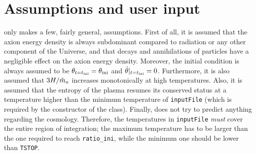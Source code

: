 \documentclass[11pt,a4paper]{article}
\begin{document}
\section{Assumptions and user input}\label{sec:assumptions}
\setcounter{equation}{0}
%
\mimes only makes a few, fairly general, assumptions. First of all, it is assumed that the axion energy density is always subdominant compared to radiation or any other component of the Universe, and that decays and annihilations of particles have a negligible effect on the axion energy density. Moreover, the initial condition is always assumed to be $\theta_{t=t_{\rm ini}{}} = \theta_{\rm ini}{}$ and $\dot \theta|_{t=t_{\rm ini}{}}=0$. 
%
Furthermore, it is also assumed that $3H/\tilde m_{a}{}$ increases monotonically at high temperatures. 
%
Also, it is assumed that the entropy of the plasma resumes its conserved status at a temperature higher than the minimum temperature of  {\tt inputFile} (which is required by the constructor of the  class).  
%
Finally, \mimes does not try to predict anything regarding the cosmology. Therefore, the temperatures in {\tt inputFile} {\em must} cover the entire region of  integration; \ie the maximum temperature has to be larger than the one required to reach {\tt ratio\_ini}, while the minimum one should be lower than {\tt TSTOP}.
\end{document}
